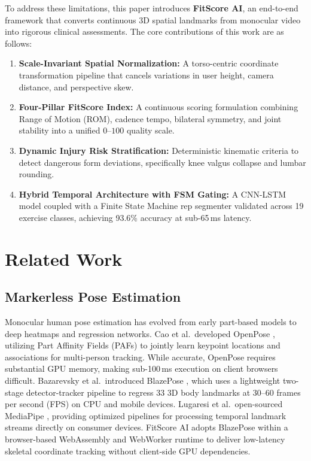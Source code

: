 \documentclass[conference]{IEEEtran}
\begin{document}
To address these limitations, this paper introduces \textbf{FitScore AI}, an end-to-end framework that converts continuous 3D spatial landmarks from monocular video into rigorous clinical assessments. The core contributions of this work are as follows:
\begin{enumerate}
    \item \textbf{Scale-Invariant Spatial Normalization:} A torso-centric coordinate transformation pipeline that cancels variations in user height, camera distance, and perspective skew.
    \item \textbf{Four-Pillar FitScore Index:} A continuous scoring formulation combining Range of Motion (ROM), cadence tempo, bilateral symmetry, and joint stability into a unified $0$--$100$ quality scale.
    \item \textbf{Dynamic Injury Risk Stratification:} Deterministic kinematic criteria to detect dangerous form deviations, specifically knee valgus collapse and lumbar rounding.
    \item \textbf{Hybrid Temporal Architecture with FSM Gating:} A CNN-LSTM model coupled with a Finite State Machine rep segmenter validated across 19 exercise classes, achieving 93.6\% accuracy at sub-65\,ms latency.
\end{enumerate}

\section{Related Work}

\subsection{Markerless Pose Estimation}
Monocular human pose estimation has evolved from early part-based models to deep heatmaps and regression networks. Cao et al.\ developed OpenPose \cite{cao2021openpose}, utilizing Part Affinity Fields (PAFs) to jointly learn keypoint locations and associations for multi-person tracking. While accurate, OpenPose requires substantial GPU memory, making sub-100\,ms execution on client browsers difficult. Bazarevsky et al.\ introduced BlazePose \cite{bazarevsky2020blazepose}, which uses a lightweight two-stage detector-tracker pipeline to regress 33 3D body landmarks at 30--60 frames per second (FPS) on CPU and mobile devices. Lugaresi et al.\ open-sourced MediaPipe \cite{lugaresi2019mediapipe}, providing optimized pipelines for processing temporal landmark streams directly on consumer devices. FitScore AI adopts BlazePose within a browser-based WebAssembly and WebWorker runtime to deliver low-latency skeletal coordinate tracking without client-side GPU dependencies.
\end{document}
